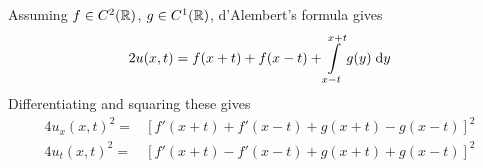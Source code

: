 Assuming $f \in C^2(\mathbb{R})$, $g \in C^1(\mathbb{R})$, d'Alembert's formula gives
$$
2 u(x, t) = f(x + t) + f(x - t) + \int \limits_{x - t}^{x + t} g(y) \;\mathrm{d}y
$$
Differentiating and squaring these gives
\begin{align*}
  4 u_x(x, t)^2 = &[f'(x + t) + f'(x - t) + g(x + t) - g(x - t)]^2\\
  4 u_t(x, t)^2 = &[f'(x + t) - f'(x - t) + g(x + t) + g(x - t)]^2\\
\end{align*}

